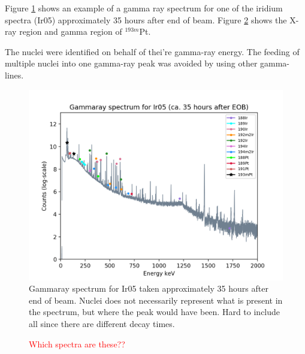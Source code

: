 Figure \ref{fig:gammarayspectrum_example} shows an example of a gamma ray spectrum for one of the iridium spectra (Ir05) approximately 35 hours after end of beam. Figure \ref{fig:193mPt_spectra} shows the X-ray region and gamma region of $^{193m}$Pt. 

The nuclei were identified on behalf of thei're gamma-ray energy. The feeding of multiple nuclei into one gamma-ray peak was avoided by using other gamma-lines. 

\begin{figure}
    \centering
    \includegraphics{Analysis/gammaray_spec_Ir05.png}
    \caption{Gammaray spectrum for Ir05 taken approximately 35 hours after end of beam. Nuclei does not necessarily represent what is present in the spectrum, but where the peak would have been. Hard to include all since there are different decay times. }
    \label{fig:gammarayspectrum_example}
\end{figure}


\begin{figure}%
    \centering
    \quad
    \caption{\textcolor{red}{Which spectra are these??  }}%
    \label{fig:193mPt_spectra}%
\end{figure}


